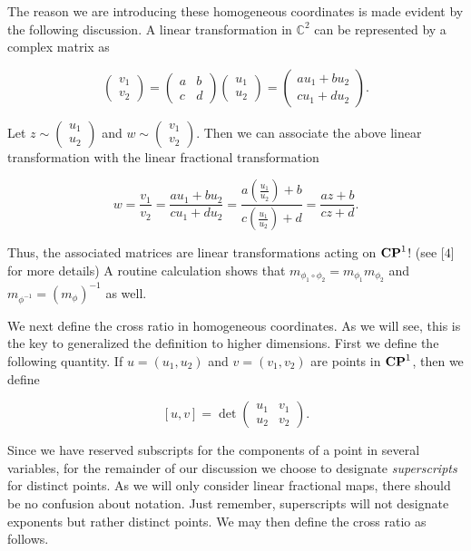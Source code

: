 \documentclass{amsart}
\theoremstyle{theorem}
\theoremstyle{lemma}
\theoremstyle{definition}
\begin{document}
The reason we are introducing these homogeneous coordinates is made evident by the following discussion. A linear transformation in $\mathbb{C}^2$ can be represented by a complex matrix as

$$\begin{pmatrix}v_1  \\  v_2\end{pmatrix}=\begin{pmatrix}a & b  \\  c & d \end{pmatrix}\begin{pmatrix}u_1  \\  u_2\end{pmatrix}=\begin{pmatrix}au_1+bu_2  \\  cu_1 +du_2 \end{pmatrix}.$$

Let $z \sim \begin{pmatrix}u_1  \\  u_2\end{pmatrix}$ and $w \sim \begin{pmatrix}v_1  \\  v_2\end{pmatrix}$. Then we can associate the above linear transformation with the linear fractional transformation 

$$w=\frac{v_1}{v_2}=\frac{au_1+bu_2}{cu_1+du_2}=\frac{a\left(\frac{u_1}{u_2}\right)+b}{c\left(\frac{u_1}{u_2}\right)+d}=\frac{az+b}{cz+d}.$$

Thus, the associated matrices are linear transformations acting on ${\bf CP}^1$! (see [$4$] for more details) A routine calculation shows that $m_{\phi_1 \circ \phi_2}=m_{\phi_1}m_{\phi_2}$ and $m_{\phi^{-1}}=(m_{\phi})^{-1}$ as well.

We next define the cross ratio in homogeneous coordinates. As we will see, this is the key to generalized the definition to higher dimensions. First we define the following quantity. If $u=(u_1, u_2)$ and $v=(v_1, v_2)$ are points in ${\bf CP}^1$, then we define

\begin{equation}
\label{eqn:def}
[u,v]=\det \begin{pmatrix}
u_1 & v_1\\ 
u_2 & v_2 
\end{pmatrix}.
\end{equation}

Since we have reserved subscripts for the components of a point in several variables, for the remainder of our discussion we choose to designate {\it superscripts} for distinct points. As we will only consider linear fractional maps, there should be no confusion about notation. Just remember, superscripts will not designate exponents but rather distinct points. We may then define the cross ratio as follows.
\end{document}
